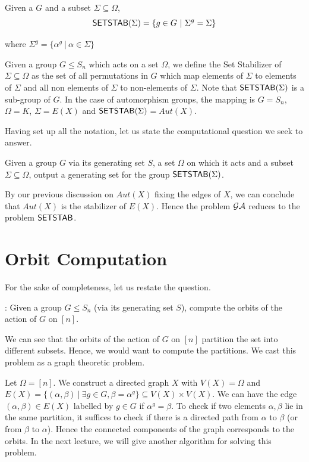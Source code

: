 \begin{definition}
	Given a $G$ and a subset $\Sigma \subseteq \Omega$, 
	\[ 	{\sf SETSTAB}(\Sigma) = \{ g \in G ~|~ \Sigma^{g} = \Sigma\} \]

	where $\Sigma^g = \{ \alpha^g ~|~ \alpha \in \Sigma \}$
\end{definition}

Given a group $G \le S_n$ which acts on a set $\Omega$, we define the Set
Stabilizer of $\Sigma \subseteq \Omega$ as the set of all permutations in $G$
which map elements of $\Sigma$ to elements of $\Sigma$ and all non elements of
$\Sigma$ to non-elements of $\Sigma$. Note that ${\sf SETSTAB}(\Sigma)$ is a
sub-group of $G$. In the case of automorphism groups, the mapping is $G =
S_n$, $\Omega = K$, $\Sigma = E(X)$ and
${\sf SETSTAB}(\Sigma)$$=$$Aut(X)$.

Having set up all the notation, let us state the computational question we
seek to answer.
\begin{problem}
Given a group $G$ via its generating set $S$, a set $\Omega$ on
which it acts and a subset $\Sigma \subseteq \Omega$, output a generating set
for the group ${\sf SETSTAB}(\Sigma)$.
\end{problem}

By our previous discussion on $Aut(X)$ fixing the edges of $X$, we can
conclude that $Aut(X)$ is the stabilizer of $E(X)$. Hence the problem $\mathcal{GA}$
reduces to the problem ${\sf SETSTAB}$.

\section{Orbit Computation}
For the sake of completeness, let us restate the question. 

 : Given a group $G \le S_{n}$ (via its generating set
$S$), compute the orbits of the action of $G$ on $[n]$.

We can see that the orbits of the action of $G$ on $[n]$ partition the set
into different subsets. Hence, we would want to compute the partitions. We
cast this problem as a graph theoretic problem.

Let $\Omega = [n]$. We construct a directed graph $X$ with $V(X) = \Omega$ and
$E(X) = \{(\alpha, \beta) ~ | ~ \exists g \in G, \beta = \alpha^g \} \subseteq
V(X) \times V(X)$.  We can have the edge $(\alpha, \beta) \in E(X)$ labelled
by $g \in G$ if $\alpha^g = \beta$. To check if two elements $\alpha, \beta$
lie in the same partition, it suffices to check if there is a directed path
from $\alpha$ to $\beta$ (or from $\beta$ to $\alpha$). Hence the connected
components of the graph corresponds to the orbits. In the next lecture, we
will give another algorithm for solving this problem.


